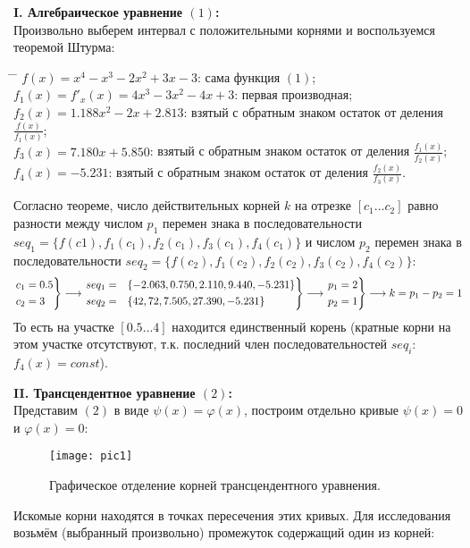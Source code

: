 {\large\bf{I. Алгебраическое уравнение $(1)$:}}\\
Произвольно выберем интервал с положительными корнями и воспользуемся теоремой Штурма:
\begin{tabbing}
    \hspace*{4cm}\= \hspace*{6cm} \= \kill
    \> $f(x) = x^4 - x^3 - 2x^2 + 3x - 3$:\> сама функция $(1)$;\\
    \> $f_1(x) = f'_x(x) = 4x^3 - 3x^2 - 4x + 3$:\> первая производная;\\
    \> $f_2(x) = 1.188x^2-2x+2.813$:\> взятый с обратным знаком остаток от деления $\frac{f(x)}{f_1(x)}$;\\
    \> $f_3(x) = 7.180x+5.850$:\> взятый с обратным знаком остаток от деления $\frac{f_1(x)}{f_2(x)}$;\\
    \> $f_4(x) = -5.231$:\> взятый с обратным знаком остаток от деления $\frac{f_2(x)}{f_3(x)}$.
\end{tabbing}
Согласно теореме, число действительных корней $k$ на отрезке $[c_1 \ldots c_2]$ равно разности между числом $p_1$ перемен знака в последовательности $seq_1=\{f(c1), f_1(c_1), f_2(c_1), f_3(c_1), f_4(c_1)\}$ и числом
$p_2$ перемен знака в последовательности $seq_2=\{f(c_2), f_1(c_2), f_2(c_2), f_3(c_2), f_4(c_2)\}$:
\begin{align}
    \begin{rcases}
        c_1 =0.5 \\
        c_2 =3
    \end{rcases}
    \longrightarrow
    \begin{rcases}
        seq_1=&\{-2.063, 0.750, 2.110, 9.440, -5.231\} \\
        seq_2=&\{42, 72, 7.505, 27.390, -5.231\}
    \end{rcases}
    \longrightarrow
    \begin{rcases}
        p_1=2 \\
        p_2=1
    \end{rcases}
    \longrightarrow
    k=p_1-p_2=1
\end{align}
То есть на участке $[0.5 \ldots 4]$ находится единственный корень (кратные корни на этом участке отсутствуют, т.к. последний член последовательностей $seq_i$:  $f_4(x)=const$).

\clearpage

{\large\bf{II. Трансцендентное уравнение $(2)$:}}\\
Представим $(2)$ в виде $\psi(x)=\varphi(x)$, построим отдельно кривые $\psi(x)=0$ и $\varphi(x)=0$:\\
\begin{figure}[H]
    \centering
    \caption{Графическое отделение корней трансцендентного уравнения.}
    \label{fig:pic1}
    \texttt{[image: pic1]}
\end{figure}
Искомые корни находятся в точках пересечения этих кривых. Для исследования возьмём (выбранный произвольно) промежуток содержащий один из корней:
\begin{align}
    [0.6 \ldots 1.5]
\end{align}

